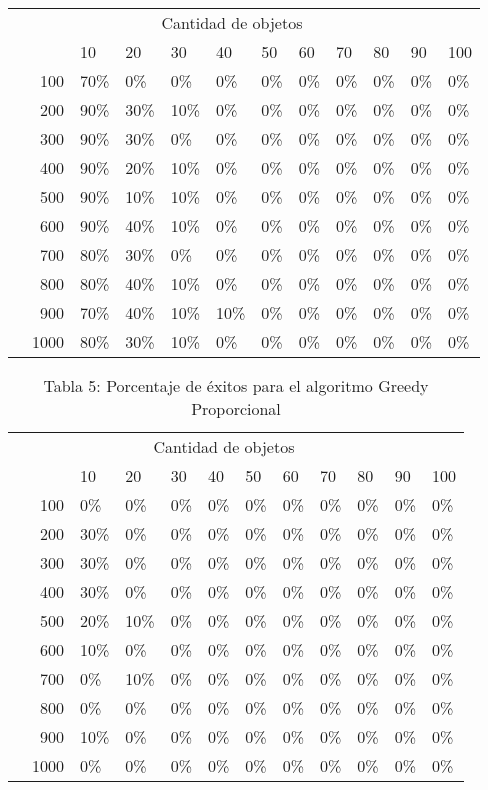 \documentclass{article}
\begin{document}
\begin{center}
\begin{table}[ht]
\begin{tabularx}{0.8\textwidth}{Xr|XXXXXXXXXX}
&\multicolumn{10}{c}{Cantidad de objetos} \\
&&10&20&30&40&50&60&70&80&90&100\\\hline
\parbox[t]{2mm}{}&100&70\%&0\%&0\%&0\%&0\%&0\%&0\%&0\%&0\%&0\%\\
&200&90\%&30\%&10\%&0\%&0\%&0\%&0\%&0\%&0\%&0\%\\
&300&90\%&30\%&0\%&0\%&0\%&0\%&0\%&0\%&0\%&0\%\\
&400&90\%&20\%&10\%&0\%&0\%&0\%&0\%&0\%&0\%&0\%\\
&500&90\%&10\%&10\%&0\%&0\%&0\%&0\%&0\%&0\%&0\%\\
&600&90\%&40\%&10\%&0\%&0\%&0\%&0\%&0\%&0\%&0\%\\
&700&80\%&30\%&0\%&0\%&0\%&0\%&0\%&0\%&0\%&0\%\\
&800&80\%&40\%&10\%&0\%&0\%&0\%&0\%&0\%&0\%&0\%\\
&900&70\%&40\%&10\%&10\%&0\%&0\%&0\%&0\%&0\%&0\%\\
&1000&80\%&30\%&10\%&0\%&0\%&0\%&0\%&0\%&0\%&0\%\\
\end{tabularx}
\end{table}
\begin{table}[ht]
\centering
\caption*{Tabla 5: Porcentaje de éxitos para el algoritmo Greedy Proporcional}
\label{5}
\begin{tabularx}{0.8\textwidth}{Xr|XXXXXXXXXX}
&\multicolumn{10}{c}{Cantidad de objetos} \\
&&10&20&30&40&50&60&70&80&90&100\\\hline
\parbox[t]{2mm}{}&100&0\%&0\%&0\%&0\%&0\%&0\%&0\%&0\%&0\%&0\%\\
&200&30\%&0\%&0\%&0\%&0\%&0\%&0\%&0\%&0\%&0\%\\
&300&30\%&0\%&0\%&0\%&0\%&0\%&0\%&0\%&0\%&0\%\\
&400&30\%&0\%&0\%&0\%&0\%&0\%&0\%&0\%&0\%&0\%\\
&500&20\%&10\%&0\%&0\%&0\%&0\%&0\%&0\%&0\%&0\%\\
&600&10\%&0\%&0\%&0\%&0\%&0\%&0\%&0\%&0\%&0\%\\
&700&0\%&10\%&0\%&0\%&0\%&0\%&0\%&0\%&0\%&0\%\\
&800&0\%&0\%&0\%&0\%&0\%&0\%&0\%&0\%&0\%&0\%\\
&900&10\%&0\%&0\%&0\%&0\%&0\%&0\%&0\%&0\%&0\%\\
&1000&0\%&0\%&0\%&0\%&0\%&0\%&0\%&0\%&0\%&0\%\\
\end{tabularx}
\end{table}
\end{center}
\end{document}
